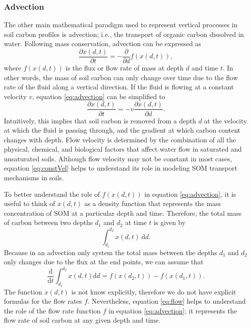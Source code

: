 \documentclass[11pt, oneside, a4paper]{article}   	%
\begin{document}
\subsubsection{Advection}
The other main mathematical paradigm used to represent vertical processes in soil carbon profiles is advection; i.e., the transport of organic carbon dissolved in water. 
Following mass conservation, advection can be expressed as
\begin{equation} \label{eq:advection}
\frac{\partial x(d, t)}{\partial t} = - \frac{\partial }{\partial d} f(x(d, t)),
\end{equation}
where $f(x(d, t))$ is the flux or flow rate of mass at depth $d$ and time $t$. In other words, the mass of soil carbon can only change over time due to the flow rate of the fluid along a vertical direction. If the fluid is flowing at a constant velocity $v$, equation \ref{eq:advection} can be simplified to
\begin{equation} \label{eq:constVel}
\frac{\partial x(d, t)}{\partial t} = -v \frac{\partial x(d, t)}{\partial d}.
\end{equation}
Intuitively, this implies that soil carbon is removed from a depth $d$ at the velocity at which the fluid is passing through, and the gradient at which carbon content changes with depth. Flow velocity is determined by the combination of all the physical, chemical, and biological factors that affect water flow in saturated and unsaturated soils. Although flow velocity may not be constant in most cases, equation \ref{eq:constVel} helps to understand its role in modeling SOM transport mechanisms in soils.  

To better understand the role of $f(x(d, t))$ in equation \ref{eq:advection}, it is useful to think of $x(d, t)$ as a density function \citep{LeVeque1990} that represents the mass concentration of SOM at a particular depth and time. Therefore, the total mass of carbon between two depths $d_1$ and $d_2$ at time $t$ is given by
$$
\int_{d_1}^{d_2} x(d, t) \ \mathrm{d}d.
$$
Because in an advection only system the total mass between the depths $d_1$ and $d_2$ only changes due to the flux at the end points, we can assume that
\begin{equation} \label{eq:flow}
\frac{\mathrm{d}}{\mathrm{d}t} \int_{d_1}^{d_2} x(d, t) \mathrm{d}d = f(x(d_2, t)) -f(x(d_1, t)).
\end{equation}
The function $x(d, t)$ is not know explicitly, therefore we do not have explicit formulas for the flow rates $f$. Nevertheless, equation \ref{eq:flow} helps to understand the role of the flow rate function $f$ in equation \ref{eq:advection}; it represents the flow rate of soil carbon at any given depth and time. 
\end{document}
